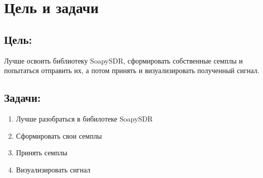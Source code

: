 \chapter{Цель и задачи}
\label{ch:intro}

\section*{\textbf{Цель:}}

Лучше освоить библиотеку SoapySDR, сформировать собственные семплы и попытаться отправить их, а потом принять и визуализировать полученный сигнал.

\section*{\textbf{Задачи:}}

\begin{enumerate}
    \item Лучше разобраться в бибилотеке SoapySDR
    \item Сформировать свои семплы
    \item Принять семплы
    \item Визуализировать сигнал
\end{enumerate}


\endinput